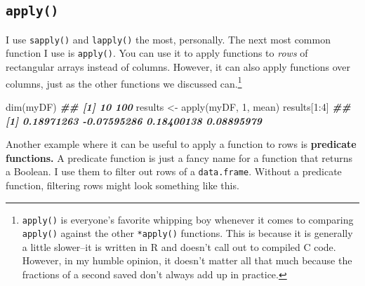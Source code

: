 \documentclass[
  12pt,
  krantz2]{krantz}
\makeatletter
\newenvironment{Shaded}{\begin{snugshade}}{\end{snugshade}}
\newcommand{\DecValTok}[1]{\textcolor[rgb]{0.06,0.06,0.06}{#1}}
\newcommand{\DocumentationTok}[1]{\textcolor[rgb]{0.37,0.37,0.37}{\textbf{\textit{#1}}}}
\newcommand{\FunctionTok}[1]{\textcolor[rgb]{0,0,0}{#1}}
\newcommand{\NormalTok}[1]{#1}
\newcommand{\OtherTok}[1]{\textcolor[rgb]{0.37,0.37,0.37}{#1}}
\newcommand{\SpecialCharTok}[1]{\textcolor[rgb]{0,0,0}{#1}}
\newenvironment{kframe}{%
\medskip{}
\setlength{\fboxsep}{.8em}
 \def\at@end@of@kframe{}%
 \ifinner\ifhmode%
  \def\at@end@of@kframe{\end{minipage}}%
  \begin{minipage}{\columnwidth}%
 \fi\fi%
 \def\FrameCommand##1{\hskip\@totalleftmargin \hskip-\fboxsep
 \colorbox{shadecolor}{##1}\hskip-\fboxsep
     \hskip-\linewidth \hskip-\@totalleftmargin \hskip\columnwidth}%
 \MakeFramed {\advance\hsize-\width
   \@totalleftmargin\z@ \linewidth\hsize
   \@setminipage}}%
 {\par\unskip\endMakeFramed%
 \at@end@of@kframe}
\renewenvironment{Shaded}{\begin{kframe}}{\end{kframe}}
\makeatother
\begin{document}
\hypertarget{apply}{%
\subsection{\texorpdfstring{\texttt{apply()}}{apply()}}\label{apply}}

I use \texttt{sapply()} and \texttt{lapply()} the most, personally. The next most common function I use is \texttt{apply()}. You can use it to apply functions to \emph{rows} of rectangular arrays instead of columns. However, it can also apply functions over columns, just as the other functions we discussed can.\footnote{\texttt{apply()} is everyone's favorite whipping boy whenever it comes to comparing \texttt{apply()} against the other \texttt{*apply()} functions. This is because it is generally a little slower--it is written in R and doesn't call out to compiled C code. However, in my humble opinion, it doesn't matter all that much because the fractions of a second saved don't always add up in practice.}

\begin{Shaded}
\begin{Highlighting}[]
\FunctionTok{dim}\NormalTok{(myDF)}
\DocumentationTok{\#\# [1]  10 100}
\NormalTok{results }\OtherTok{\textless{}{-}} \FunctionTok{apply}\NormalTok{(myDF, }\DecValTok{1}\NormalTok{, mean)}
\NormalTok{results[}\DecValTok{1}\SpecialCharTok{:}\DecValTok{4}\NormalTok{]}
\DocumentationTok{\#\# [1]  0.18971263 {-}0.07595286  0.18400138  0.08895979}
\end{Highlighting}
\end{Shaded}

Another example where it can be useful to apply a function to rows is \textbf{predicate functions.} A predicate function is just a fancy name for a function that returns a Boolean. I use them to filter out rows of a \texttt{data.frame}. Without a predicate function, filtering rows might look something like this.
\end{document}
